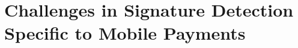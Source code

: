 \documentclass[a4paper, oneside]{csthesis}
\begin{document}









\section{Challenges in Signature Detection Specific to Mobile Payments}
\end{document}
